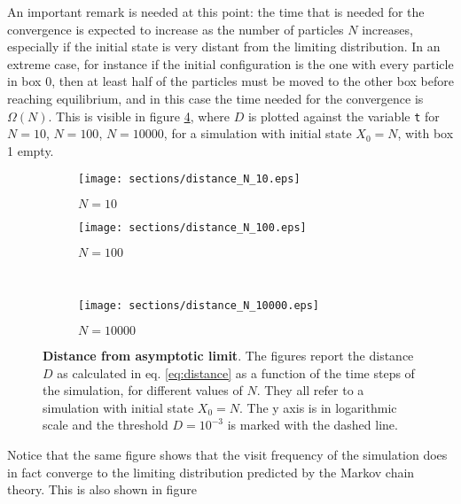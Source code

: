 An important remark is needed at this point: the time that is needed for the convergence is expected to increase as the number of particles $N$ increases, especially if the initial state is very distant from the limiting distribution. In an extreme case, for instance if the initial configuration is the one with every particle in box 0, then at least half of the particles must be moved to the other box before reaching equilibrium, and in this case the time needed for the convergence is $\Omega(N)$. This is visible in figure \ref{fig:distances}, where $D$ is plotted against the variable \texttt{t} for $N = 10$, $N = 100$, $N = 10000$, for a simulation with initial state $X_0 = N$, \ie with box 1 empty.

\begin{figure}
    \begin{subfigure}{.5\textwidth}
        \centering
        \texttt{[image: sections/distance\_N\_10.eps]}
        \caption{$N = 10$}
        \label{fig:sfig1}
      \end{subfigure}
      \begin{subfigure}{.5\textwidth}
        \centering
        \texttt{[image: sections/distance\_N\_100.eps]}
        \caption{$N = 100$}
        \label{fig:sfig2}
      \end{subfigure}\\
      \begin{center}
      \begin{subfigure}{0.5\textwidth}
        \centering
        \texttt{[image: sections/distance\_N\_10000.eps]}
        \caption{$N = 10000$}
        \label{fig:sfig3}
      \end{subfigure}%
    \end{center}

    \captionsetup{width=.9\linewidth}
    \caption{\textbf{Distance from asymptotic limit}. The figures report the distance $D$ as calculated in eq. \ref{eq:distance} as a function of the time steps of the simulation, for different values of $N$. They all refer to a simulation with initial state $X_0 = N$. The y axis is in logarithmic scale and the threshold $D = 10^{-3}$ is marked with the dashed line.}
    \label{fig:distances}
\end{figure}

Notice that the same figure shows that the visit frequency of the simulation does in fact converge to the limiting distribution predicted by the Markov chain theory. This is also shown in figure




